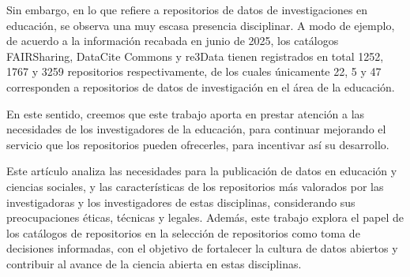 \documentclass[runningheads]{llncs}
\begin{document}
Sin embargo, en lo que refiere a repositorios de datos de investigaciones en educación, se observa una muy escasa presencia disciplinar. A modo de ejemplo, de acuerdo a la información recabada en junio de 2025, los catálogos FAIRSharing, DataCite Commons y re3Data tienen registrados en total 1252, 1767 y 3259 repositorios respectivamente, de los cuales únicamente 22, 5 y 47 corresponden a repositorios de datos de investigación en el área de la educación.

En este sentido, creemos que este trabajo aporta en prestar atención a las necesidades de los investigadores de la educación, para continuar mejorando el servicio que los repositorios pueden ofrecerles, para incentivar así su desarrollo.


Este artículo analiza las necesidades para la publicación de datos en educación y ciencias sociales, y las características  de los repositorios más valorados por las investigadoras y los investigadores de estas disciplinas, considerando sus preocupaciones éticas, técnicas y legales. Además, este trabajo explora el papel de los catálogos de repositorios en la selección de repositorios como toma de decisiones informadas, con el objetivo de fortalecer la cultura de datos abiertos y contribuir al avance de la ciencia abierta en estas disciplinas.\\



\end{document}
